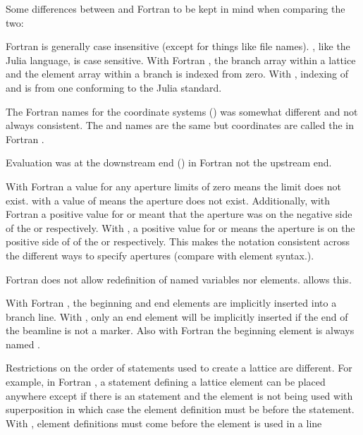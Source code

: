 Some differences between \accellat and Fortran \bmad to
be kept in mind when comparing the two:
\begin{description}
\item
Fortran \bmad is generally case insensitive (except for things like file names). \accellat, like
the Julia language, is case sensitive.
%
With Fortran \bmad, the branch array within a lattice and the element array within a branch is
indexed from zero. With \bmadjl, indexing of  and  is 
from one conforming to the Julia standard.
%
\item
The Fortran \bmad names for the coordinate systems () was somewhat different and not
always consistent. The  and  names are the same but 
coordinates are called the  in Fortran \bmad.
%
\item
Evaluation was at the downstream end () in Fortran \bmad not the upstream end.
%
\item
With Fortran \bmad a value for any aperture limits of zero means the limit does not exist.
with \accellat a value of  means the aperture does not exist. Additionally, with
Fortran \bmad a positive value for  or  meant that the aperture was
on the negative side of the  or  respectively. With \accellat, a positive
value for  or  means the aperture is on the positive side of 
of the  or  respectively. This makes the notation consistent across 
the different ways to specify apertures (compare with  element syntax.).
%
\item
Fortran \bmad does not allow redefinition of named variables nor elements. \accellat allows this.
%
\item
With Fortran \bmad, the beginning and end elements are implicitly inserted into a branch line.
With \accellat, only an end element will be implicitly inserted if the end of the beamline is
not a marker. 
Also with Fortran \bmad the beginning element is always named . 
%
\item
Restrictions on the order of statements used to create a lattice are different. 
For example, in Fortran \bmad, a statement defining a lattice element can be placed anywhere
except if there is an  statement and the element is not being used
with superposition in which case the element definition must be before the 
statement. With \accellat, element definitions must come before the element is used in a line

\end{description}
